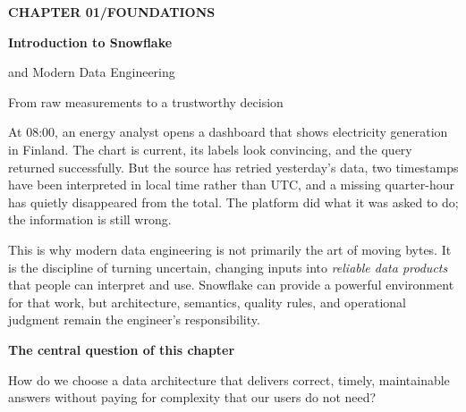 \documentclass[11pt,twoside]{article}
\begin{document}
{\sffamily\bfseries\color{teal}\fontsize{10}{12}\selectfont CHAPTER 01\quad /\quad FOUNDATIONS}\par\vspace{2mm}
{\sffamily\bfseries\color{navy}\fontsize{24}{27}\selectfont Introduction to Snowflake\par and Modern Data Engineering}\par
\vspace{1mm}{\color{steelblue}\rule{\linewidth}{1.5pt}}\par
\vspace{2mm}
{\sffamily\color{inkgray}\fontsize{11.5}{15}\selectfont From raw measurements to a trustworthy decision}\par\vspace{2mm}
At 08:00, an energy analyst opens a dashboard that shows electricity generation in Finland. The chart is current, its labels look convincing, and the query returned successfully. But the source has retried yesterday's data, two timestamps have been interpreted in local time rather than UTC, and a missing quarter-hour has quietly disappeared from the total. The platform did what it was asked to do; the information is still wrong.

This is why modern data engineering is not primarily the art of moving bytes. It is the discipline of turning uncertain, changing inputs into \emph{reliable data products} that people can interpret and use. Snowflake can provide a powerful environment for that work, but architecture, semantics, quality rules, and operational judgment remain the engineer's responsibility.

\begin{insight}
\textbf{The central question of this chapter}\par
How do we choose a data architecture that delivers correct, timely, maintainable answers without paying for complexity that our users do not need?
\end{insight}
\end{document}
